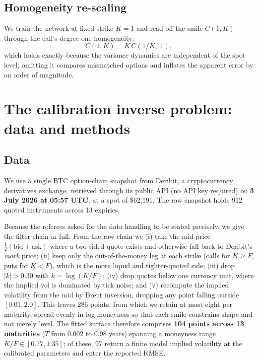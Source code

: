 \documentclass[preprint,12pt]{elsarticle}
\begin{document}
\subsection{Homogeneity re-scaling}
We train the network at fixed strike $K{=}1$ and read off the smile $C(1,K)$
through the call's degree-one homogeneity:
\begin{equation}
  C(1,K) = K\,C\!\left(1/K,\;1\right),
  \label{eq:homog}
\end{equation}
which holds exactly because the variance dynamics are independent of the spot
level; omitting it compares mismatched options and inflates the apparent error
by an order of magnitude.

\section{The calibration inverse problem: data and methods}
\label{sec:calib}

\subsection{Data}
\label{sec:data}
We use a single BTC option-chain snapshot from Deribit, a cryptocurrency
derivatives exchange, retrieved through its public API (no API key required) on
\textbf{3 July 2026 at 05:57 UTC}, at a spot of \$62{,}191. The raw snapshot
holds 912 quoted instruments across 13 expiries.

Because the referees asked for the data handling to be stated precisely, we give
the filter chain in full. From the raw chain we (i) take the mid price
$\tfrac12(\text{bid}+\text{ask})$ where a two-sided quote exists and otherwise
fall back to Deribit's \emph{mark} price; (ii) keep only the out-of-the-money
leg at each strike (calls for $K\ge F$, puts for $K<F$), which is the more
liquid and tighter-quoted side; (iii) drop $|k|>0.30$ with $k=\log(K/F)$;
(iv) drop quotes below one currency unit, where the implied vol is dominated by
tick noise; and (v) recompute the implied volatility from the mid by Brent
inversion, dropping any point falling outside $[0.01,2.0]$. This leaves 286
points, from which we retain at most eight per maturity, spread evenly in
log-moneyness so that each smile constrains shape and not merely level. The
fitted surface therefore comprises \textbf{104 points across 13 maturities}
($T$ from $0.002$ to $0.98$ years) spanning a moneyness range
$K/F\in[0.77,1.35]$; of these, 97 return a finite model implied volatility at
the calibrated parameters and enter the reported RMSE.
\end{document}

